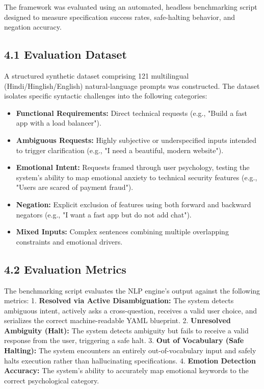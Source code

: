 \documentclass[11pt,a4paper]{article}
\begin{document}
The framework was evaluated using an automated, headless benchmarking script designed to measure specification success rates, safe-halting behavior, and negation accuracy.

\subsection{4.1 Evaluation Dataset}
A structured synthetic dataset comprising 121 multilingual (Hindi/Hinglish/English) natural-language prompts was constructed. The dataset isolates specific syntactic challenges into the following categories:
\begin{itemize}
    \item \textbf{Functional Requirements:} Direct technical requests (e.g., "Build a fast app with a load balancer").
    \item \textbf{Ambiguous Requests:} Highly subjective or underspecified inputs intended to trigger clarification (e.g., "I need a beautiful, modern website").
    \item \textbf{Emotional Intent:} Requests framed through user psychology, testing the system's ability to map emotional anxiety to technical security features (e.g., "Users are scared of payment fraud").
    \item \textbf{Negation:} Explicit exclusion of features using both forward and backward negators (e.g., "I want a fast app but do not add chat").
    \item \textbf{Mixed Inputs:} Complex sentences combining multiple overlapping constraints and emotional drivers.
\end{itemize}

\subsection{4.2 Evaluation Metrics}
The benchmarking script evaluates the NLP engine's output against the following metrics:
1. \textbf{Resolved via Active Disambiguation:} The system detects ambiguous intent, actively asks a cross-question, receives a valid user choice, and serializes the correct machine-readable YAML blueprint.
2. \textbf{Unresolved Ambiguity (Halt):} The system detects ambiguity but fails to receive a valid response from the user, triggering a safe halt.
3. \textbf{Out of Vocabulary (Safe Halting):} The system encounters an entirely out-of-vocabulary input and safely halts execution rather than hallucinating specifications.
4. \textbf{Emotion Detection Accuracy:} The system's ability to accurately map emotional keywords to the correct psychological category.
\end{document}
